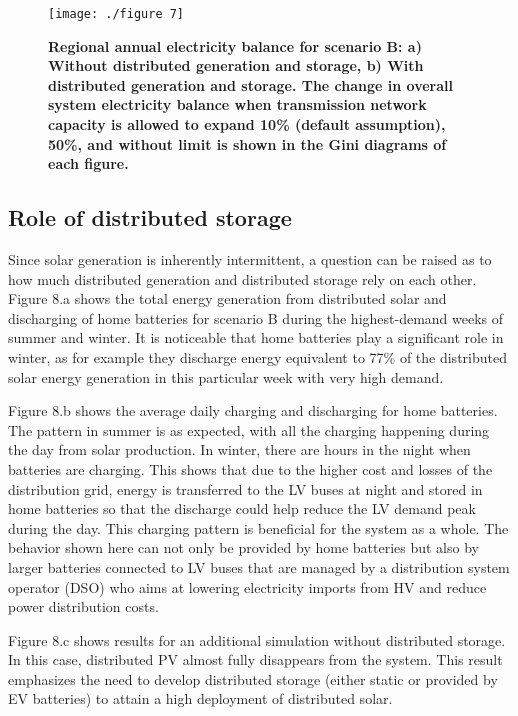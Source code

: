 \documentclass[review]{elsarticle}
\begin{document}
	\begin{figure}
		\texttt{[image: ./figure 7]}
		\caption{\textbf{Regional annual electricity balance for scenario B: a) Without distributed generation and storage, b) With distributed generation and storage. The change in overall system electricity balance when transmission network capacity is allowed to expand 10\% (default assumption), 50\%, and without limit is shown in the Gini diagrams of each figure.}}
		\label{fig:balance_maps}
	\end{figure}
	
	\subsection{Role of distributed storage}
	
	Since solar generation is inherently intermittent, a question can be raised as to how much distributed generation and distributed storage rely on each other. Figure 8.a shows the total energy generation from distributed solar and discharging of home batteries for scenario B during the highest-demand weeks of summer and winter. It is noticeable that home batteries play a significant role in winter, as for example they discharge energy equivalent to 77\% of the distributed solar energy generation in this particular week with very high demand.
	
	Figure 8.b shows the average daily charging and discharging for home batteries. The pattern in summer is as expected, with all the charging happening during the day from solar production. In winter, there are hours in the night when batteries are charging. This shows that due to the higher cost and losses of the distribution grid, energy is transferred to the LV buses at night and stored in home batteries so that the discharge could help reduce the LV demand peak during the day. This charging pattern is beneficial for the system as a whole. The behavior shown here can not only be provided by home batteries but also by larger batteries connected to LV buses that are managed by a distribution system operator (DSO) who aims at lowering electricity imports from HV and reduce power distribution costs.
	
	Figure 8.c shows results for an additional simulation without distributed storage. In this case, distributed PV almost fully disappears from the system. This result emphasizes the need to develop distributed storage (either static or provided by EV batteries) to attain a high deployment of distributed solar. 
	
\end{document}
